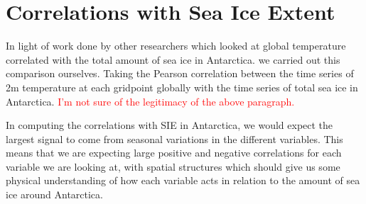\section{Correlations with Sea Ice Extent}
In light of work done by other researchers which looked at global temperature correlated with the total amount of sea ice in Antarctica. \cite{Wang2019Compounding2016, Meehl2019Sustained2016} we carried out this comparison ourselves. Taking the Pearson correlation between the time series of 2m temperature at each gridpoint globally with the time series of total sea ice in Antarctica. \textcolor{red}{I'm not sure of the legitimacy of the above paragraph.}

In computing the correlations with SIE in Antarctica, we would expect the largest signal to come from seasonal variations in the different variables. This means that we are expecting large positive and negative correlations for each variable we are looking at, with spatial structures which should give us some physical understanding of how each variable acts in relation to the amount of sea ice around Antarctica.





